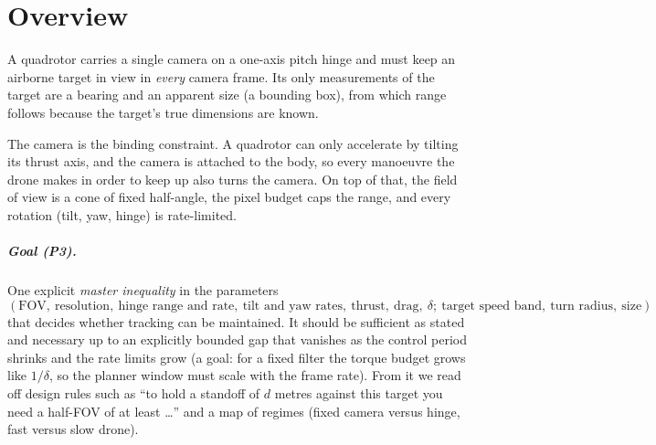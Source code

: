 \chapter{Overview}
\label{chap:overview}

A quadrotor carries a single camera on a one-axis pitch hinge and must keep an
airborne target in view in \emph{every} camera frame. Its only measurements of
the target are a bearing and an apparent size (a bounding box), from which range
follows because the target's true dimensions are known.

The camera is the binding constraint. A quadrotor can only accelerate by tilting
its thrust axis, and the camera is attached to the body, so every manoeuvre the
drone makes in order to keep up also turns the camera. On top of that, the field of
view is a cone of fixed half-angle, the pixel budget caps the range, and every
rotation (tilt, yaw, hinge) is rate-limited.

\paragraph{Goal (P3).} One explicit \emph{master inequality} in the parameters
\[
  (\text{FOV},\ \text{resolution},\ \text{hinge range and rate},\ \text{tilt and
  yaw rates},\ \text{thrust},\ \text{drag},\ \delta;\ \text{target speed band},
  \ \text{turn radius},\ \text{size})
\]
that decides whether tracking can be maintained. It should be sufficient as
stated and necessary up to an explicitly bounded gap that vanishes as the control
period shrinks and the rate limits grow (a goal: for a fixed filter the torque budget grows like $1/\delta$, so the planner window must scale with the frame rate). From it we read off design rules such as
``to hold a standoff of $d$ metres against this target you need a half-FOV of at
least \dots'' and a map of regimes (fixed camera versus hinge, fast versus slow
drone).


